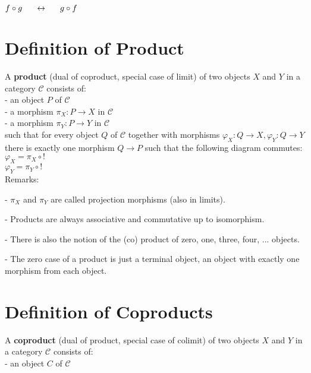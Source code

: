 \documentclass[a4paper, twoside, english, 11pt]{book}
\newcommand{\C}{\mathcal C}
\begin{document}
\noindent
$f \circ g \indent \leftrightarrow \indent g \circ f$



\section{Definition of Product}

A \textbf{product} (dual of coproduct, special case of limit) of two objects $X$ and $Y$ in a category $\C$ consists of: \\

- an object $P$ of $\C$ \\

- a morphism $\pi_X : P \rightarrow X$ in $\C$ \\

- a morphism $\pi_Y : P \rightarrow Y$ in $\C$ \\

\noindent
such that for every object $Q$ of $\C$ together with morphisms $\varphi_X : Q \rightarrow X, \varphi_Y : Q \rightarrow Y$ there is exactly one morphism $Q \rightarrow P$ such that the following diagram commutes: \\

$\varphi_X = \pi_X \circ !$ \\
\indent
$\varphi_Y = \pi_Y \circ !$ \\

\noindent
Remarks:

- $\pi_X$ and $\pi_Y$ are called projection morphisms (also in limits).

- Products are always associative and commutative up to isomorphism.

- There is also the notion of the (co) product of zero, one, three, four, ... objects.

- The zero case of a product is just a terminal object, an object with exactly one morphism from each object.



\section{Definition of Coproducts}

A \textbf{coproduct} (dual of product, special case of colimit) of two objects $X$ and $Y$ in a category $\C$ consists of: \\

- an object $C$ of $\C$ \\
\end{document}
